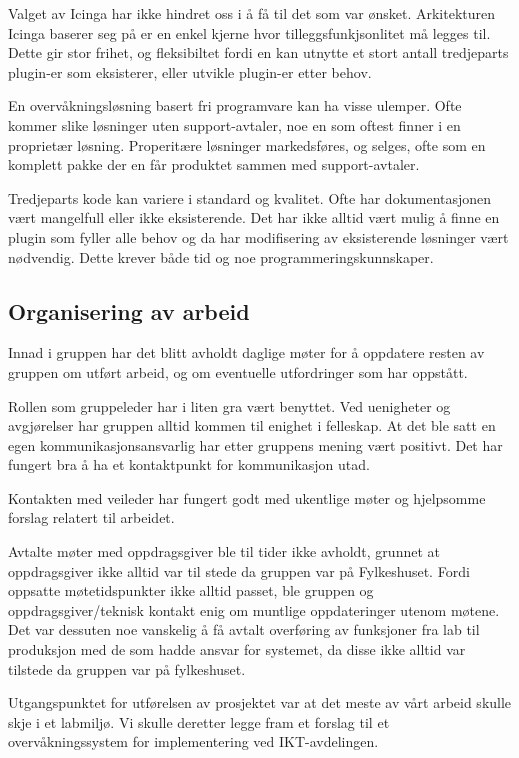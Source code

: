 Valget av Icinga har ikke hindret oss i å få til det som var ønsket. Arkitekturen Icinga baserer seg på er en enkel kjerne hvor tilleggsfunkjsonlitet må legges til. Dette gir stor frihet, og fleksibiltet fordi en kan utnytte et stort antall tredjeparts plugin-er som eksisterer, eller utvikle plugin-er etter behov. 

En overvåkningsløsning basert fri programvare kan ha visse ulemper. Ofte kommer slike løsninger uten support-avtaler, noe en som oftest finner i en proprietær løsning. Properitære løsninger markedsføres, og selges, ofte som en komplett pakke der en får produktet sammen med support-avtaler. 

Tredjeparts kode kan variere i standard og kvalitet. Ofte har dokumentasjonen vært mangelfull eller ikke eksisterende. Det har ikke alltid vært mulig å finne en plugin som fyller alle behov og da har modifisering av eksisterende løsninger vært nødvendig. Dette krever både tid og noe programmeringskunnskaper.

\subsection{Organisering av arbeid}
Innad i gruppen har det blitt avholdt daglige møter for å oppdatere resten av gruppen om utført arbeid, og om eventuelle utfordringer som har oppstått. 

Rollen som gruppeleder har i liten gra vært benyttet. Ved uenigheter og avgjørelser har gruppen alltid kommen til enighet i felleskap. At det ble satt en egen kommunikasjonsansvarlig har etter gruppens mening vært positivt. Det har fungert bra å ha et kontaktpunkt for kommunikasjon utad.

Kontakten med veileder har fungert godt med ukentlige møter og hjelpsomme forslag relatert til arbeidet.

Avtalte møter med oppdragsgiver ble til tider ikke avholdt, grunnet at oppdragsgiver ikke alltid var til stede da gruppen var på Fylkeshuset. Fordi oppsatte møtetidspunkter ikke alltid passet, ble gruppen og oppdragsgiver/teknisk kontakt enig om muntlige oppdateringer utenom møtene. Det var dessuten noe vanskelig å få avtalt overføring av funksjoner fra lab til produksjon med de som hadde ansvar for systemet, da disse ikke alltid var tilstede da gruppen var på fylkeshuset. 

Utgangspunktet for utførelsen av prosjektet var at det meste av vårt arbeid skulle skje i et labmiljø. Vi skulle deretter legge fram et forslag til et overvåkningssystem for implementering ved IKT-avdelingen.

